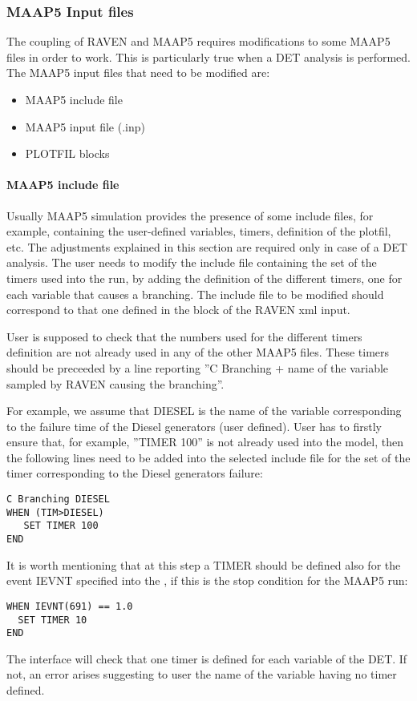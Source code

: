 \subsubsection{MAAP5 Input files}
The coupling of RAVEN and MAAP5 requires modifications to some
MAAP5 files in order to work. This is particularly true when a DET analysis is performed.
The MAAP5 input files that need to be modified are:
\begin{itemize}
  \item MAAP5 include file
  \item MAAP5 input file (.inp)
  \item PLOTFIL blocks
\end{itemize}
\paragraph{MAAP5 include file}
Usually MAAP5 simulation provides the presence of some include files, for example,
containing the user-defined variables, timers, definition of the plotfil, etc.
The adjustments explained in this section are required only in case of a DET analysis.
The user needs to modify the include file containing the set of the
timers used into the run, by adding the definition of the different timers,
one for each variable that causes a branching.
The include file to be modified should correspond to that one defined in the 
block of the RAVEN xml input.

User is supposed to check that the numbers used for the different timers definition
are not already used in any of the other MAAP5 files.
These timers should be preceeded by a line reporting ''C Branching + name of the variable
sampled by RAVEN causing the branching''.

For example, we assume that DIESEL is the name of the variable corresponding to the failure time
of the Diesel generators (user defined). User has to firstly ensure that, for example,
''TIMER 100'' is not already used into the model, then the following lines
need to be added into the selected include file for the set of the timer corresponding
to the Diesel generators failure:
\begin{lstlisting}[style=XML]
C Branching DIESEL
WHEN (TIM>DIESEL)
   SET TIMER 100
END
\end{lstlisting}
It is worth mentioning that at this step a TIMER should be defined
also for the event IEVNT specified into the ,
 if this is the stop condition for the MAAP5 run:
\begin{lstlisting}[style=XML]
WHEN IEVNT(691) == 1.0
  SET TIMER 10
END
\end{lstlisting}
The interface will check that one timer is defined for each variable
of the DET. If not, an error arises suggesting to user the name of the variable having no
timer defined.
